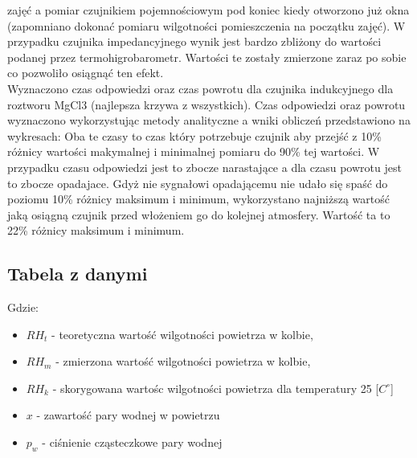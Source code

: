 \documentclass[11pt]{article}
\begin{document}
    zajęć a pomiar czujnikiem pojemnościowym pod koniec kiedy otworzono już okna (zapomniano dokonać pomiaru wilgotności pomieszczenia na początku zajęć).
    W przypadku czujnika impedancyjnego wynik jest bardzo zbliżony do wartości podanej przez termohigrobarometr. Wartości te zostały zmierzone zaraz
    po sobie co pozwoliło osiągnąć ten efekt.\\
    \indent Wyznaczono czas odpowiedzi oraz czas powrotu dla czujnika indukcyjnego dla roztworu MgCl3 (najlepsza krzywa z wszystkich).
    Czas odpowiedzi oraz powrotu wyznaczono wykorzystując metody analityczne a wniki obliczeń przedstawiono na wykresach:
    \noindent{}
    \noindent{}
    \indent Oba te czasy to czas który potrzebuje czujnik aby przejść z 10\% różnicy wartości makymalnej i minimalnej pomiaru do 90\%
    tej wartości. W przypadku czasu odpowiedzi jest to zbocze narastające a dla czasu powrotu jest to zbocze opadajace. Gdyż nie sygnałowi
    opadającemu nie udało się spaść do poziomu 10\% różnicy maksimum i minimum, wykorzystano najniższą wartość jaką osiągną czujnik przed włożeniem
    go do kolejnej atmosfery. Wartość ta to 22\% różnicy maksimum i minimum.\\
    \subsection{Tabela z danymi}
    \begin{center}
        \Large{}
    \end{center}
    \noindent Gdzie:
        {\footnotesize
    \begin{itemize}
        \setlength\itemsep{0em}
        \item[] \textbf{$RH_t$} - teoretyczna wartość wilgotności powietrza w kolbie,
        \item[] \textbf{$RH_m$} - zmierzona wartość wilgotności powietrza w kolbie,
        \item[] \textbf{$RH_k$} - skorygowana wartośc wilgotności powietrza dla temperatury 25 [$C^\circ$]
        \item[] \textbf{$x$} - zawartość pary wodnej w powietrzu
        \item[] \textbf{$p_w$} - ciśnienie cząsteczkowe pary wodnej
    \end{itemize}}
\newpage
\end{document}
